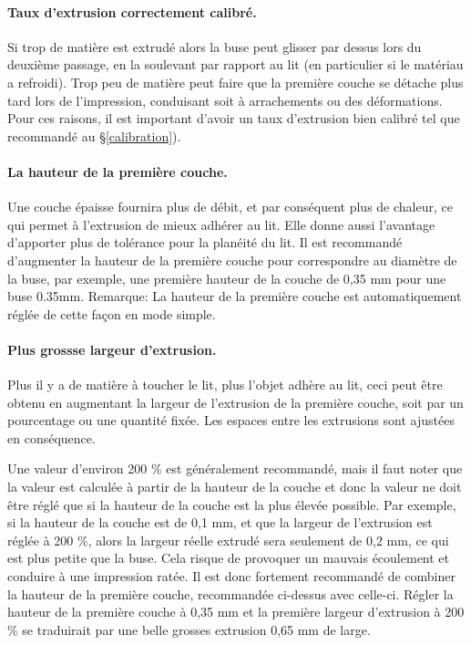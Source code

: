 \paragraph{Taux d'extrusion correctement calibré.} %
\label{par:correct_extrusion_settings}
Si trop de matière est extrudé alors la buse peut glisser par dessus lors du deuxième passage, en la soulevant par rapport au lit (en particulier si le matériau a refroidi). Trop peu de matière peut faire que la première couche se détache plus tard lors de l'impression, conduisant soit à arrachements ou des déformations. Pour ces raisons, il est important d'avoir un taux d'extrusion bien calibré tel que recommandé au §\ref{calibration}).

\paragraph{La hauteur de la première couche.} %
\label{par:first_layer_height}
Une couche épaisse fournira plus de débit, et par conséquent plus de chaleur, ce qui permet à l'extrusion de mieux adhérer au lit. Elle donne aussi l'avantage d'apporter plus de tolérance pour la planéité du lit. Il est recommandé d'augmenter la hauteur de la première couche pour correspondre au diamètre de la buse, par exemple, une première hauteur de la couche de 0,35 mm pour une buse 0.35mm.
Remarque: La hauteur de la première couche est automatiquement réglée de cette façon en mode simple.

\paragraph{Plus grossse largeur d'extrusion.} %
\label{par:wider_extrusion_width}
Plus il y a de matière à toucher le lit, plus l'objet adhère au lit, ceci peut être obtenu en augmentant la largeur de l'extrusion de la première couche, soit par un pourcentage ou une quantité fixée. Les espaces entre les extrusions sont ajustées en conséquence.

Une valeur d'environ 200 \% est généralement recommandé, mais il faut noter que la valeur est calculée à partir de la hauteur de la couche et donc la valeur ne doit être réglé que si la hauteur de la couche est la plus élevée possible. Par exemple, si la hauteur de la couche est de 0,1 mm, et que la largeur de l'extrusion est réglée à 200 \%, alors la largeur réelle extrudé sera seulement de 0,2 mm, ce qui est plus petite que la buse. Cela risque de provoquer un mauvais écoulement et conduire à une impression ratée. Il est donc fortement recommandé de combiner la hauteur de la première couche, recommandée ci-dessus avec celle-ci. Régler la hauteur de la première couche à 0,35 mm et la première largeur d'extrusion à 200 \% se traduirait par une belle grosses extrusion 0,65 mm de large.

